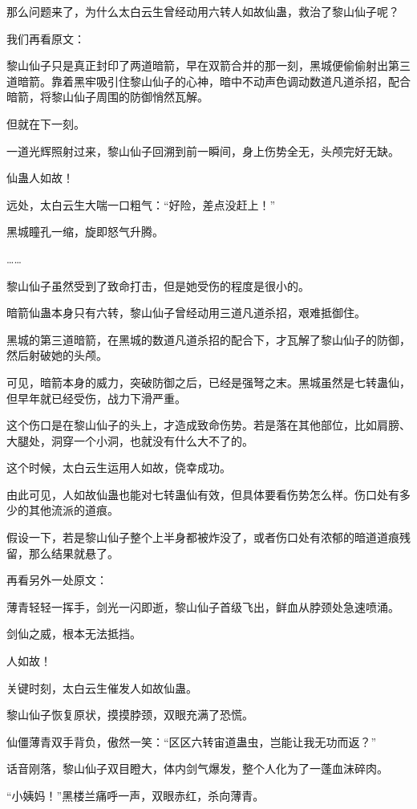 \begin{this_body}
那么问题来了，为什么太白云生曾经动用六转人如故仙蛊，救治了黎山仙子呢？

我们再看原文：

黎山仙子只是真正封印了两道暗箭，早在双箭合并的那一刻，黑城便偷偷射出第三道暗箭。靠着黑牢吸引住黎山仙子的心神，暗中不动声色调动数道凡道杀招，配合暗箭，将黎山仙子周围的防御悄然瓦解。

但就在下一刻。

一道光辉照射过来，黎山仙子回溯到前一瞬间，身上伤势全无，头颅完好无缺。

仙蛊人如故！

远处，太白云生大喘一口粗气：“好险，差点没赶上！”

黑城瞳孔一缩，旋即怒气升腾。

……

黎山仙子虽然受到了致命打击，但是她受伤的程度是很小的。

暗箭仙蛊本身只有六转，黎山仙子曾经动用三道凡道杀招，艰难抵御住。

黑城的第三道暗箭，在黑城的数道凡道杀招的配合下，才瓦解了黎山仙子的防御，然后射破她的头颅。

可见，暗箭本身的威力，突破防御之后，已经是强弩之末。黑城虽然是七转蛊仙，但早年就已经受伤，战力下滑严重。

这个伤口是在黎山仙子的头上，才造成致命伤势。若是落在其他部位，比如肩膀、大腿处，洞穿一个小洞，也就没有什么大不了的。

这个时候，太白云生运用人如故，侥幸成功。

由此可见，人如故仙蛊也能对七转蛊仙有效，但具体要看伤势怎么样。伤口处有多少的其他流派的道痕。

假设一下，若是黎山仙子整个上半身都被炸没了，或者伤口处有浓郁的暗道道痕残留，那么结果就悬了。

再看另外一处原文：

薄青轻轻一挥手，剑光一闪即逝，黎山仙子首级飞出，鲜血从脖颈处急速喷涌。

剑仙之威，根本无法抵挡。

人如故！

关键时刻，太白云生催发人如故仙蛊。

黎山仙子恢复原状，摸摸脖颈，双眼充满了恐慌。

仙僵薄青双手背负，傲然一笑：“区区六转宙道蛊虫，岂能让我无功而返？”

话音刚落，黎山仙子双目瞪大，体内剑气爆发，整个人化为了一蓬血沫碎肉。

“小姨妈！”黑楼兰痛呼一声，双眼赤红，杀向薄青。


\end{this_body}
